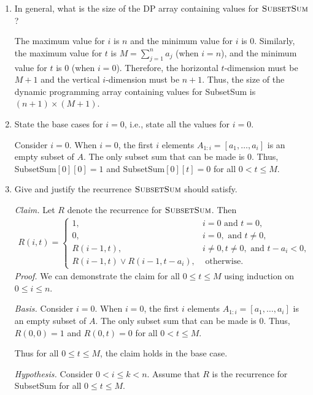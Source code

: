 \begin{enumerate}
\item In general, what is the size of the DP array containing values for $\textsc{SubsetSum}$?
\begin{solution}
The maximum value for $i$ is $n$ and the minimum value for $i$ is $0$. Similarly, the maximum value for $t$ is $M=\sum_{j=1}^n{a_j}$ (when $i=n$), and the minimum value for $t$ is $0$ (when $i=0$). Therefore, the horizontal $t$-dimension must be $M+1$ and the vertical $i$-dimension must be $n+1$. Thus, the size of the dynamic programming array containing values for {\sc SubsetSum} is $(n+1)\times(M+1)$.
\end{solution}
\item State the base cases for $i=0$, i.e., state all the values for $i=0$.
\begin{solution}
Consider $i=0$. When $i=0$, the first $i$ elements $A_{1:i}=[a_1,\dots,a_i]$ is an empty subset of $A$. The only subset sum that can be made is $0$. Thus, {\sc SubsetSum}$[0][0]=1$ and {\sc SubsetSum}$[0][t]=0$ for all $0<t\leq M$. 
\end{solution}
\item Give and justify the recurrence $\textsc{SubsetSum}$ should satisfy.
\begin{solution}
\textit{Claim. }Let $R$ denote the recurrence for $\textsc{SubsetSum}$. Then
\begin{align*}
R(i,t)=
\begin{cases} 
    1,&i=0\text{ and }t=0,\\
    0,&i=0,\text{ and }t\neq 0,\\
    R(i-1,t),&i\neq 0,t\neq 0,\text{ and }t-a_i<0,\\
    R(i-1,t)\lor R(i-1,t-a_i),&\text{ otherwise.}
\end{cases}
\end{align*}
\textit{Proof. }We can demonstrate the claim for all $0\leq t\leq M$ using induction on $0\leq i\leq n$.

\textit{Basis. }Consider $i=0$. When $i=0$, the first $i$ elements $A_{1:i}=[a_1,\dots,a_i]$ is an empty subset of $A$. The only subset sum that can be made is $0$. Thus, $R(0,0)=1$ and $R(0,t)=0$ for all $0<t\leq M$.

Thus for all $0\leq t\leq M$, the claim holds in the base case.

\textit{Hypothesis. }Consider $0<i\leq k<n$. Assume that $R$ is the recurrence for {\sc SubsetSum} for all $0\leq t\leq M$.


\end{solution}
\end{enumerate}
